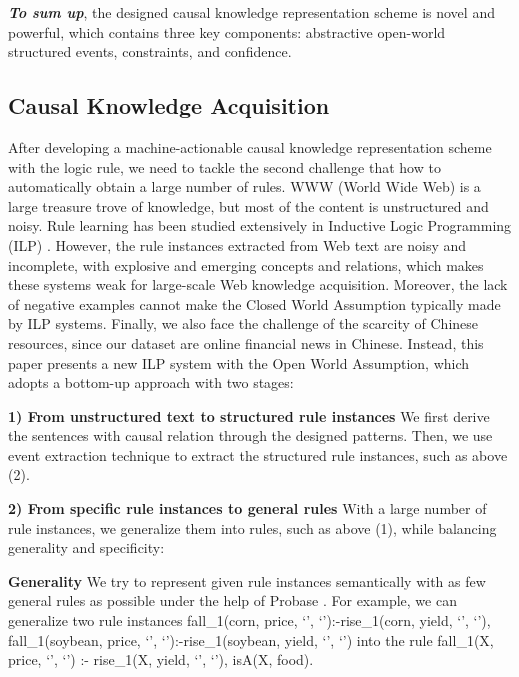 \textbf{\textit{To sum up}}, 
the designed causal knowledge representation scheme is novel and powerful, which contains three key components: abstractive open-world structured events, constraints, and confidence.

\subsection{Causal Knowledge Acquisition}
\label{intro:Causal_Knowledge_Mining}
After developing a machine-actionable causal knowledge representation scheme with the logic rule, we need to tackle the second challenge that how to automatically obtain a large number of rules.  
WWW (World Wide Web) is a large treasure trove of knowledge, but most of the content is unstructured and noisy.
Rule learning has been studied extensively in Inductive Logic Programming (ILP) \cite{Quinlan1990,Muggleton1997}. However, the rule instances extracted from Web text are noisy and incomplete, with explosive and emerging concepts and relations, which makes these systems weak for large-scale Web knowledge acquisition. Moreover, the lack of negative examples cannot make the Closed World Assumption typically made by ILP systems. Finally, we also face the challenge of the scarcity of Chinese resources, since our dataset are online financial news in Chinese. Instead, this paper presents a new ILP system with the Open World Assumption, which adopts a bottom-up approach with two stages:

\textbf{1) From unstructured text to structured rule instances} We first derive the sentences with causal relation through the designed patterns. Then, we use event extraction technique to extract the structured rule instances, such as above (2).
	
\textbf{2) From specific rule instances to general rules} With a large number of rule instances, we generalize them into rules, such as above (1), while balancing generality and specificity:
	
\textbf{Generality} We try to represent given rule instances semantically with as few general rules as possible under the help of Probase \cite{Wu2012a}. For example, we can generalize two rule instances fall\_1(corn, price, `', `'):-rise\_1(corn, yield, `', `'), fall\_1(soybean, price, `', `'):-rise\_1(soybean, yield, `', `') into the rule fall\_1(X, price, `', `') :- rise\_1(X, yield, `', `'), isA(X, food).


